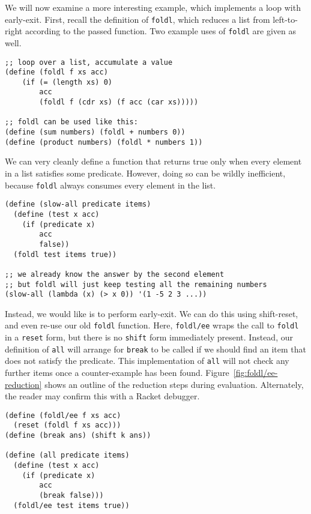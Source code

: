 \documentclass[11pt]{article}
\begin{document}
We will now examine a more interesting example, which implements a loop with early-exit.
First, recall the definition of \texttt{foldl}, which reduces a list from left-to-right according to the passed function.
Two example uses of \texttt{foldl} are given as well.

\begin{verbatim}
;; loop over a list, accumulate a value
(define (foldl f xs acc)
    (if (= (length xs) 0)
        acc
        (foldl f (cdr xs) (f acc (car xs)))))

;; foldl can be used like this:
(define (sum numbers) (foldl + numbers 0))
(define (product numbers) (foldl * numbers 1))
\end{verbatim}

We can very cleanly define a function that returns true only when every element in a list satisfies some predicate.
However, doing so can be wildly inefficient, because \texttt{foldl} always consumes every element in the list.

\begin{verbatim}
(define (slow-all predicate items)
  (define (test x acc)
    (if (predicate x)
        acc
        false))
  (foldl test items true))
  
;; we already know the answer by the second element
;; but foldl will just keep testing all the remaining numbers
(slow-all (lambda (x) (> x 0)) '(1 -5 2 3 ...))
\end{verbatim}

Instead, we would like is to perform early-exit.
We can do this using shift-reset, and even re-use our old \texttt{foldl} function.
Here, \texttt{foldl/ee} wraps the call to \texttt{foldl} in a \texttt{reset} form, but there is no \texttt{shift} form immediately present.
Instead, our definition of \texttt{all} will arrange for \texttt{break} to be called if we should find an item that does not satisfy the predicate.
This implementation of \texttt{all} will not check any further items once a counter-example has been found.
Figure~\ref{fig:foldl/ee-reduction} shows an outline of the reduction steps during evaluation.
Alternately, the reader may confirm this with a Racket debugger.

\begin{verbatim}
(define (foldl/ee f xs acc)
  (reset (foldl f xs acc)))
(define (break ans) (shift k ans))

(define (all predicate items)
  (define (test x acc)
    (if (predicate x)
        acc
        (break false)))
  (foldl/ee test items true))
\end{verbatim}
\end{document}
